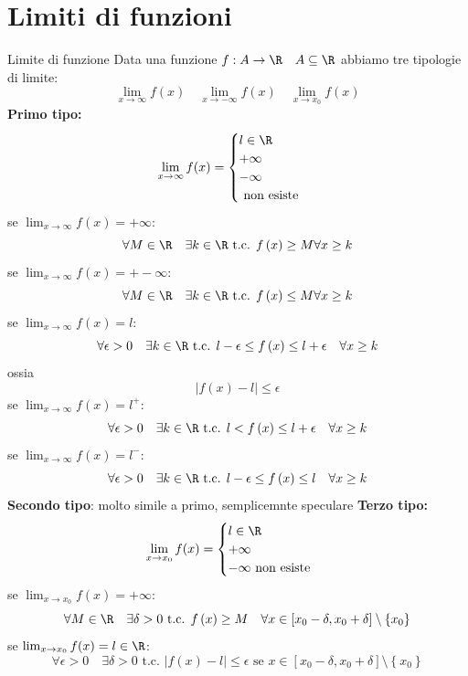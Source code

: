 \section{Limiti di funzioni}
\begin{definizione}{Limite di funzione}
	Data una funzione $f : A \rightarrow \R \quad  A \subseteq \R$ abbiamo tre tipologie di limite:
	\[
		\lim_{x \to \infty} f(x) \quad \lim_{x \to -\infty} f(x) \quad \lim_{x \to x_0} f(x)
	\]
	\textbf{Primo tipo:}
	\[
		\lim_{x \to \infty} f(x) = \begin{cases}
			l \in \R \\
			+ \infty \\
			- \infty \\
			\text{ non esiste }
		\end{cases}
	\]
	se $ \lim_{x \to \infty} f(x) = + \infty$:
	\[
		\forall M \in  \R \quad \exists k \in  \R \text{ t.c. } f\left( x \right) \ge M \forall x \ge k
	\]
	se $ \lim_{x \to \infty} f(x) = + -\infty$:
	\[
		\forall M \in  \R \quad \exists k \in  \R \text{ t.c. } f\left( x \right) \le M \forall x \ge k
	\]
	se $ \lim_{x \to \infty} f(x) = l$:
	\[
		\forall \epsilon > 0 \quad \exists k \in  \R \text{ t.c. } l- \epsilon \le f\left( x \right) \le l+ \epsilon \quad \forall x \ge k
	\]
	ossia
	\[
		\left|f\left( x \right) -l\right| \le \epsilon
	\]
	se $ \lim_{x \to \infty} f(x) = l^{+}$:
	\[
		\forall \epsilon > 0 \quad \exists k \in  \R \text{ t.c. }  l <  f\left( x \right) \le l+ \epsilon \quad \forall x \ge k
	\]
	se $ \lim_{x \to \infty} f(x) = l^{-}$:
	\[
		\forall \epsilon > 0 \quad \exists k \in  \R \text{ t.c. }  l-\epsilon \le f\left( x \right) \le l \quad \forall x \ge k
	\]
	\textbf{Secondo tipo}: molto simile a primo, semplicemnte speculare
	\vskip3mm
	\textbf{Terzo tipo:}
	\[
		\lim_{x \to x_0} f(x) =
		\begin{cases}
			l \in  \R \\
			+ \infty  \\
			-\infty
			\text{ non esiste }
		\end{cases}
	\]
	se $\lim_{x \to x_0} f(x) = + \infty$:
	\[
		\forall M \in  \R \quad \exists \delta > 0 \text{ t.c. } f\left( x \right)  \ge M \quad \forall x \in \left[ x_0-\delta, x_0+\delta \right] \setminus \left\{ x_0 \right\}
	\]
	se $\lim_{x \to x_0} f(x) = l \in  \R$:
	\[
		\forall \epsilon >0 \quad \exists \delta > 0 \text{ t.c. } \left|f\left( x \right) -l \right|\le \epsilon \text{ se } x \in \left[ x_0- \delta, x_0+ \delta \right] \setminus \left\{ x_0 \right\}
	\]

\end{definizione}
